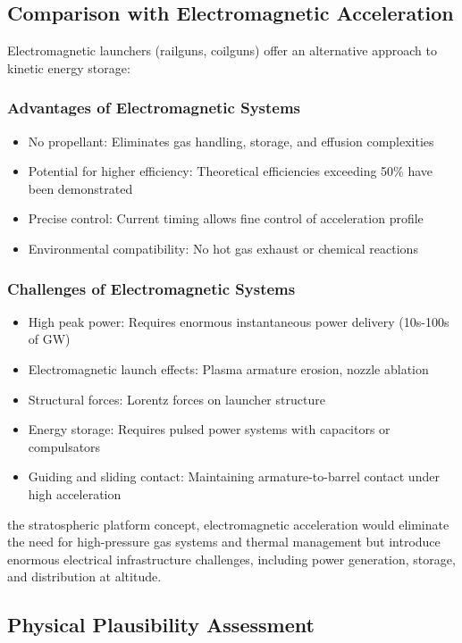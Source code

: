 \documentclass{article}
\begin{document}
\n\subsection{Comparison with Electromagnetic Acceleration}
Electromagnetic launchers (railguns, coilguns) offer an alternative approach to kinetic energy storage:\n\n\subsubsection{Advantages of Electromagnetic Systems}
\begin{itemize}
    \item No propellant: Eliminates gas handling, storage, and effusion complexities\n    \item Potential for higher efficiency: Theoretical efficiencies exceeding 50\% have been demonstrated\n    \item Precise control: Current timing allows fine control of acceleration profile\n    \item Environmental compatibility: No hot gas exhaust or chemical reactions\n\end{itemize}
\n\subsubsection{Challenges of Electromagnetic Systems}
\begin{itemize}
    \item High peak power: Requires enormous instantaneous power delivery (10s-100s of GW)\n    \item Electromagnetic launch effects: Plasma armature erosion, nozzle ablation\n    \item Structural forces: Lorentz forces on launcher structure\n    \item Energy storage: Requires pulsed power systems with capacitors or compulsators\n    \item Guiding and sliding contact: Maintaining armature-to-barrel contact under high acceleration\n\end{itemize}
\nFor the stratospheric platform concept, electromagnetic acceleration would eliminate the need for high-pressure gas systems and thermal management but introduce enormous electrical infrastructure challenges, including power generation, storage, and distribution at altitude.\n\n\subsection{Physical Plausibility Assessment}
\end{document}
